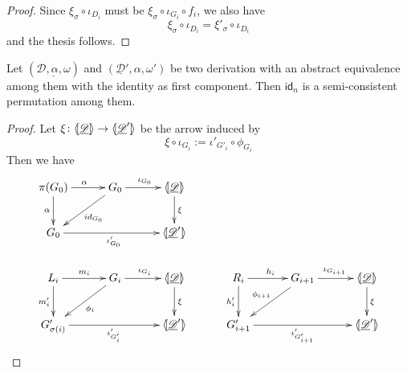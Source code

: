 \documentclass[a4paper,UKenglish,cleveref,pdftex,thm-restate,numberwithinsect]{lipics-v2021}
\newcommand{\id}[1]{\mathsf{id}_{#1}}
\def\G{\textbf {\textup{G}}}
\newcommand{\dder}[1]{\mathscr{#1}}
\newcommand{\der}[1]{\underline{\dder{#1}}}
\newcommand{\lpro}{\langle \hspace{-1.85pt}[}
\newcommand{\rpro}{]\hspace{-1.85pt}\rangle}
\newcommand{\tpro}[1]{\lpro \der{#1}\rpro}
\begin{document}
\begin{proof}
	Since $\xi_\sigma \circ \iota_{D_i}$ must be $\xi_\sigma \circ \iota_{G_i}\circ f_i$, we also have
	\[\xi_\sigma \circ \iota_{D_i}=\xi'_\sigma \circ \iota_{D_i}\] 
	and the thesis follows.
\end{proof}

\begin{proposition}\label{prop:abstoswitch}
	Let $(\der{D, \alpha, \omega})$ and $(\der{D}', \alpha, \omega')$ be two derivation with an abstract equivalence among them with the identity as first component. Then $\id{n}$ is a semi-consistent permutation among them.
\end{proposition}
\begin{proof}
Let $\xi\colon \tpro{D}\to \lpro \der{D}'\rpro$ be the arrow induced by 
\[\xi \circ \iota_{G_i}:=\iota'_{G'_i}\circ \phi_{G_i}\] 
Then we have
	\[\xymatrix@C=30pt{\pi(G_0)\ar[r]^{\alpha} \ar[d]_{\alpha} & G_0 \ar[dl]^{\id{G_0}} \ar[r]^{\iota_{G_0}} &\tpro{D} \ar[d]^{\xi}\\ G_0 \ar[rr]_{\iota'_{G_0}} & &\lpro \der{D}' \rpro\\L_i \ar[r]^{m_i} \ar[d]_{m'_{i}}& G_i \ar[dl]^{\phi_i} \ar[r]^{\iota_{G_i}} &\tpro{D} \ar[d]^{\xi} & R_i \ar[r]^{h_i} \ar[d]_{h'_{i}}& G_{i+1} \ar[dl]_{\phi_{i+1}} \ar[r]^{\iota_{G_{i+1}}} &\tpro{D} \ar[d]^{\xi} \\G'_{\sigma(i)} \ar[rr]_{\iota'_{G'_{i}}}&& \lpro \der{D}' \rpro& G'_{i+1} \ar[rr]_{\iota'_{G'_{i+1}}}&& \lpro \der{D}' \rpro}\]
\end{proof}
\end{document}
